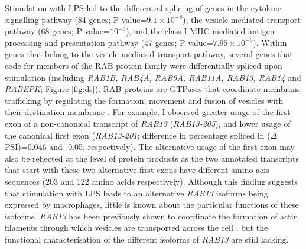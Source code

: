 Stimulation with LPS led to the differential splicing of genes in the cytokine signalling pathway (84 genes; P-value=$9.1\times10^{-8}$), the vesicle-mediated transport pathway (68 genes; P-value=$10^{-6}$), and the class I MHC mediated antigen processing and presentation pathway (47 genes; P-value=$7.95\times10^{-6}$). Within genes that belong to the vesicle-mediated transport pathway, several genes that code for members of the RAB protein family were differentially spliced upon stimulation (including \textit{RAB1B, RAB4A, RAB9A, RAB11A, RAB13, RAB14} and \textit{RABEPK}; Figure \ref{fig:ds}). RAB proteins are GTPases that coordinate membrane trafficking by regulating the formation, movement and fusion of vesicles with their destination membrane \cite{Stenmark2009-ju}. For example, I observed greater usage of the first exon of a non-canonical transcript of \textit{RAB13} (\textit{RAB13-205}), and lower usage of the canonical first exon (\textit{RAB13-201}; difference in percentage spliced in ($\Delta$PSI)=0.046 and -0.05, respectively). The alternative usage of the first exon may also be reflected at the level of protein products as the two annotated transcripts that start with these two alternative first exons have different amino acis sequences (203 and 122 amino acids respectively). Although this finding suggests that stimulation with LPS leads to an alternative \textit{RAB13} isoforms being expressed by macrophages, little is known about the particular functions of these isoforms. \textit{RAB13} has been previously shown to coordinate the formation of actin filaments through which vesicles are transported across the cell \cite{Sakane2012-km}, but the functional characterisation of the different isoforms of \textit{RAB13} are still lacking.\\

